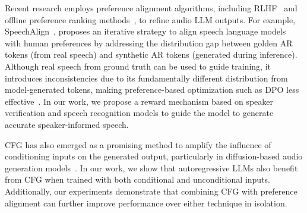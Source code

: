 

Recent research employs preference alignment algorithms, including RLHF~\cite{ouyang2022rlhf} and offline preference ranking methods~\cite{rafailov2024direct,azar2024ipo}, to refine audio LLM outputs.
For example, SpeechAlign~\cite{zhang2024speechalign}, proposes an iterative strategy to align speech language models with human preferences by addressing the distribution gap between golden AR tokens (from real speech) and synthetic AR tokens (generated during inference). 
Although real speech from ground truth can be used to guide training, it introduces inconsistencies due to its fundamentally different distribution from model-generated tokens, making preference-based optimization such as DPO less effective~\cite{rafailov2024direct}. 
In our work, we propose a reward mechanism based on speaker verification and speech recognition models to guide the model to generate accurate speaker-informed speech. 

CFG has also emerged as a promising method to amplify the influence of conditioning inputs on the generated output, particularly in diffusion-based audio generation models~\cite{chen2024f5,liu2023audioldm}.
In our work, we show that autoregressive LLMs also benefit from CFG when trained with both conditional and unconditional inputs. Additionally, our experiments demonstrate that combining CFG with preference alignment can further improve performance over either technique in isolation.


